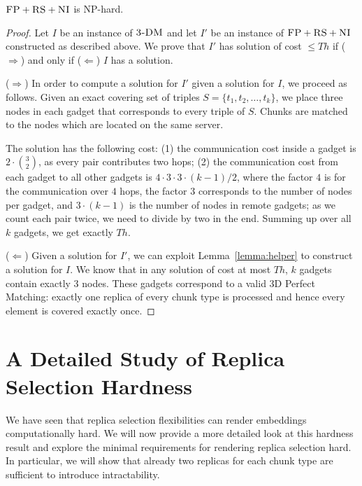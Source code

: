 \documentclass[preprint,12pt]{elsarticle}
\newcommand{\CC}{\textsc{NI}}
\newcommand{\FP}{\textsc{FP}}
\newcommand{\RS}{\textsc{RS}}
\newcommand{\TDM}{\textsc{3-DM}}
\newcommand{\Thr}{\ensuremath{Th}}
\begin{document}
\begin{theorem}
\label{theorem:fp_rs_cc}
$\FP+\RS+\CC$ is NP-hard.
\end{theorem}
\begin{proof}
Let $I$ be an instance of $\TDM$ and let $I'$ be an instance of
$\FP+\RS+\CC$ constructed as described above.
We prove that $I'$ has solution of cost $\leq \Thr$ if ($\Rightarrow$) and only if
($\Leftarrow$)
$I$ has a solution.

($\Rightarrow$) In order to compute a solution
for $I'$ given a solution for $I$, we proceed as follows.
Given an exact covering set of triples $S = \{t_1, t_2,
\ldots, t_k\}$, we place three nodes in each gadget that
corresponds to every triple of $S$. Chunks are matched to the nodes which are located
on the same server.

The solution has the following cost:
(1) the communication cost inside a gadget is $2 \cdot {3 \choose 2}$,
  as every pair contributes two hops;
  (2) the communication cost from each gadget to all other gadgets is $4
  \cdot 3 \cdot 3 \cdot (k - 1) / 2$, where the factor $4$ is
  for the
  communication over $4$ hops, the factor $3$
  corresponds to the number of nodes per gadget, and
  $3 \cdot (k-1)$ is the number of nodes in remote gadgets;
  as we count each pair twice, we need to divide by two in the end.
Summing up over all $k$ gadgets, we get exactly $\Thr$.

($\Leftarrow$) Given a solution for $I'$,
we can exploit Lemma~\ref{lemma:helper} to construct a solution for $I$.
We know that in any solution of cost at most $\Thr$,
$k$ gadgets contain exactly 3 nodes. These gadgets correspond to a valid
3D Perfect Matching: exactly one replica of every chunk type is processed and
hence every element is covered exactly once.
\end{proof}



\section{A Detailed Study of Replica Selection Hardness}\label{ap:tworep}

We have seen that replica selection flexibilities can render embeddings computationally hard.
We will now provide a more detailed look at this hardness result
and explore the minimal requirements for rendering replica selection hard.
In particular, we will show that already two replicas for each chunk type are sufficient to
introduce intractability.
\end{document}
